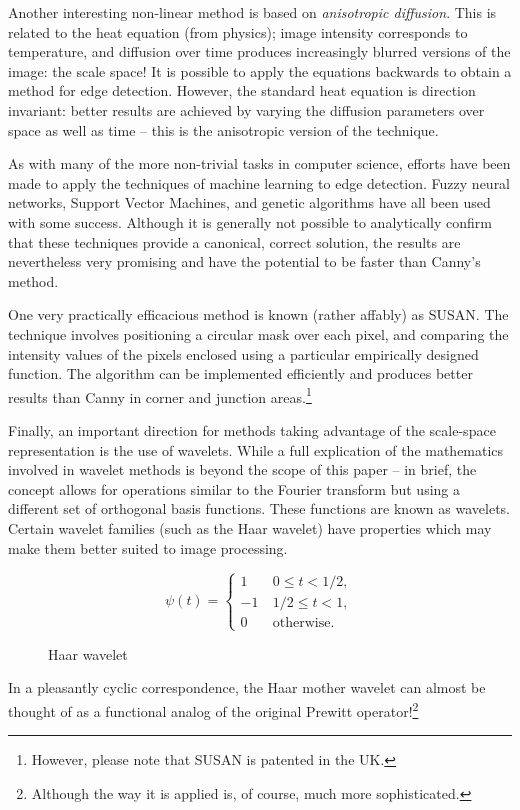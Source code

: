 \documentclass{acm_proc_article-sp}
\begin{document}
Another interesting non-linear method is based on \emph{anisotropic
diffusion}\cite{perona1990scale}. This is related to the heat equation (from
physics); image intensity corresponds to temperature, and diffusion over time
produces increasingly blurred versions of the image: the scale space! It is
possible to apply the equations backwards to obtain a method for edge
detection. However, the standard heat equation is direction invariant: better
results are achieved by varying the diffusion parameters over space as well as
time -- this is the anisotropic version of the technique.

As with many of the more non-trivial tasks in computer science, efforts have
been made to apply the techniques of machine learning to edge detection. Fuzzy
neural networks\cite{Lu20032395}, Support Vector Machines\cite{Zheng20041143},
and genetic algorithms\cite{Bhandarkar19941159} have all been used with some
success. Although it is generally not possible to analytically confirm that
these techniques provide a canonical, correct solution, the results are
nevertheless very promising and have the potential to be faster than Canny's
method.

One very practically efficacious method is known (rather affably) as
SUSAN\cite{smith1997susan}. The technique involves positioning a circular mask
over each pixel, and comparing the intensity values of the pixels enclosed
using a particular empirically designed function. The algorithm can be
implemented efficiently and produces better results than Canny in corner and
junction areas.\footnote{However, please note that SUSAN is patented in the
UK.}

Finally, an important direction for methods taking advantage of the scale-space
representation is the use of wavelets.\cite{heric2007combined} While a full
explication of the mathematics involved in wavelet methods is beyond the scope
of this paper -- in brief, the concept allows for operations similar to the
Fourier transform but using a different set of orthogonal basis functions.
These functions are known as wavelets.  Certain wavelet families (such as the
Haar wavelet) have properties which may make them better suited to image
processing.
\begin{figure}[h]
\begin{displaymath}
\psi(t) = \begin{cases}1 
\quad & 0 \leq  t < 1/2,\\
 -1 & 1/2 \leq t < 1,\\0 &\mbox{otherwise.}\end{cases}
\end{displaymath}
\caption{Haar wavelet}
\end{figure}
In a pleasantly cyclic correspondence, the Haar mother wavelet can almost be
thought of as a functional analog of the original Prewitt
operator!\footnote{Although the way it is applied is, of course, much more
sophisticated.}
\end{document}
